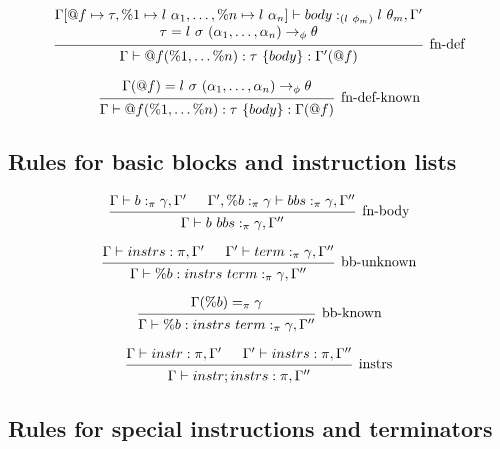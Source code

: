 \documentclass{article}
\begin{document}
\[
\begin{prooftree}
    \hypo{
    \begin{matrix}
        \Gamma[@f \mapsto \tau, \%1 \mapsto l\ \alpha_1, \ldots, \%n \mapsto l\ \alpha_n] \vdash body :_{(l\ \phi_m)} l\ \theta_m, \Gamma' \\
        \tau = l\ \sigma\ (\alpha_1, \dots, \alpha_n) \rightarrow_\phi \theta
    \end{matrix}
    }
    \infer1[fn-def]{\Gamma \vdash @f(\%1, \dots \%n) : \tau\ \{ body \} : \Gamma'(@f)  }
    
\end{prooftree}
\]

\[
\begin{prooftree}
    \hypo{
    \Gamma(@f) = l\ \sigma\ (\alpha_1, \dots, \alpha_n) \rightarrow_\phi \theta
    }
    \infer1[fn-def-known]{\Gamma \vdash @f(\%1, \dots \%n) : \tau\ \{ body \} : \Gamma(@f)  }
\end{prooftree}
\]

\subsection{Rules for basic blocks and instruction lists}

\[
\begin{prooftree} 
    \hypo{\Gamma \vdash b :_\pi \gamma, \Gamma'}
    \hypo{\Gamma', \%b :_\pi \gamma \vdash bbs :_\pi \gamma, \Gamma''}
    \infer2[fn-body]{\Gamma \vdash b\ bbs :_\pi \gamma, \Gamma''}
\end{prooftree} 
\]


\[
\begin{prooftree} 
    \hypo{\Gamma \vdash instrs : \pi, \Gamma'}
    \hypo{\Gamma' \vdash term :_\pi \gamma, \Gamma''}
    \infer2[bb-unknown]{\Gamma \vdash \%b: instrs\ term :_\pi \gamma, \Gamma''}
\end{prooftree} 
\]


\[
\begin{prooftree} 
    \hypo{\Gamma(\%b) =_\pi \gamma} 
    \infer1[bb-known]{\Gamma \vdash \%b: instrs\ term :_\pi \gamma, \Gamma''}
\end{prooftree} 
\]


\[
\begin{prooftree} 
    \hypo{\Gamma \vdash instr : \pi, \Gamma'}
    \hypo{\Gamma' \vdash instrs : \pi, \Gamma''}
    \infer2[instrs]{\Gamma \vdash instr; instrs : \pi, \Gamma''}
\end{prooftree} 
\]

\subsection{Rules for special instructions and terminators}
\end{document}
